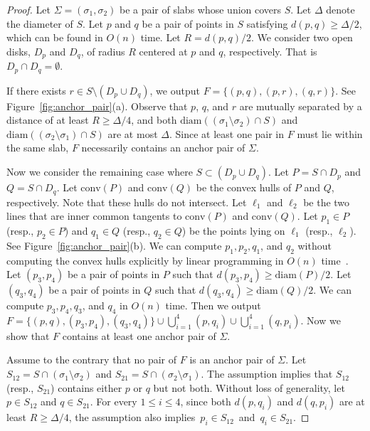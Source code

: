 \documentclass[10pt,a4paper]{article}
\theoremstyle{star}
\theoremstyle{claimstar}
\newcommand{\diam}{\ensuremath{\mathrm{diam}}}
\newcommand{\conv}{\ensuremath{\mathrm{conv}}}
\begin{document}
\begin{proof}
    Let $\Sigma = (\sigma_1, \sigma_2)$ be a pair of slabs whose union covers $S$.
    Let $\Delta$ denote the diameter of $S$. 
    Let $p$ and $q$ be a pair of points in $S$ satisfying $d(p, q) \ge \Delta/2$, which can be found in $O(n)$ time.
    Let $R = d(p, q)/2$. 
    We consider two open disks, $D_p$ and $D_q$, of radius $R$ centered at $p$ and $q$, respectively. 
    That is $D_p \cap D_q = \emptyset$.

    If there exists $r\in S\setminus (D_p\cup D_q)$, 
    we output $F = \{(p,q ), (p, r), (q, r) \}$. See Figure~\ref{fig:anchor_pair}(a). 
    Observe that $p$, $q$, and $r$ are mutually separated by a distance of at least $R \geq \Delta/4$, and both $\diam((\sigma_1 \setminus \sigma_2) \cap S)$ and $\diam((\sigma_2 \setminus \sigma_1) \cap S)$ are at most $\Delta$.
    Since at least one pair in $F$ must lie within the same slab, $F$ necessarily contains an anchor pair of $\Sigma$.

    Now we consider the remaining case where $S\subset (D_p \cup D_q)$. 
    Let $P = S\cap D_p$ and $Q = S\cap D_q$. 
    Let $\conv(P)$ and $\conv(Q)$ be the convex hulls of $P$ and $Q$, respectively. Note that these hulls do not intersect. 
    Let $\ell_1$ and $\ell_2$ be the two lines that are inner common tangents to $\conv(P)$ and $\conv(Q)$. 
    Let $p_1 \in P$ (resp., $p_2 \in P$) and $q_1 \in Q$ (resp., $q_2 \in Q$) be the points lying on $\ell_1$ (resp., $\ell_2$). 
    See Figure~\ref{fig:anchor_pair}(b).
    We can compute $p_1, p_2, q_1$, and $q_2$ without computing the convex hulls explicitly by linear programming in $O(n)$ time~\cite{Dyer1984LinearTime_LP, Megiddo1984LinearTime_LP}. 
    Let $(p_3, p_4)$ be a pair of points in $P$ such that $d(p_3, p_4) \ge \diam(P)/2$. 
    Let $(q_3, q_4)$ be a pair of points in $Q$ such that $d(q_3, q_4) \ge \diam(Q)/2$. We can compute $p_3, p_4, q_3$, and $q_4$ in $O(n)$ time. 
    Then we output $F = \{(p, q), (p_3, p_4), (q_3, q_4) \} \cup \bigcup_{i=1}^4 (p, q_i)  \cup \bigcup_{i=1}^4 (q, p_i)$. Now we show that $F$ contains at least one anchor pair of $\Sigma$.

    Assume to the contrary that no pair of $F$ is an anchor pair of $\Sigma$. 
    Let $S_{12} = S\cap (\sigma_1 \setminus \sigma_2)$ and $S_{21} = S\cap (\sigma_2 \setminus \sigma_1)$.
    The assumption implies that $S_{12}$ (resp., $S_{21}$) contains either $p$ or $q$ but not both. 
    Without loss of generality, let $p\in S_{12}$ and $q \in S_{21}$. 
    For every $1\le i \le 4$, since both $d(p, q_i)$ and $d(q, p_i)$ are at least $R \ge \Delta/4$, the assumption also implies~$p_i \in S_{12}$~and~$q_i \in S_{21}$.


\end{proof}
\end{document}
